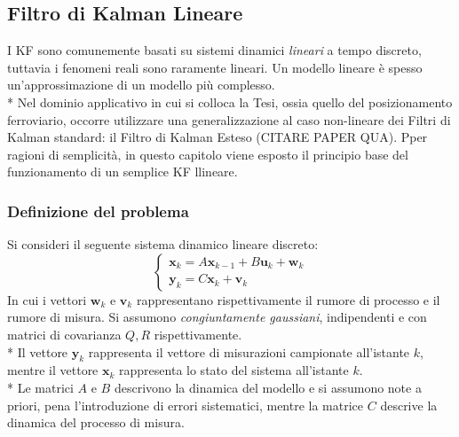 \subsection{Filtro di Kalman Lineare}
I KF sono comunemente basati su sistemi dinamici \emph{lineari} a tempo discreto, tuttavia i fenomeni reali sono raramente lineari. Un modello lineare \`e spesso un'approssimazione di un modello pi\`u complesso.\\*
Nel dominio applicativo in cui si colloca la Tesi, ossia quello del posizionamento ferroviario, occorre utilizzare una generalizzazione al caso non-lineare dei Filtri di Kalman standard: il Filtro di Kalman Esteso (CITARE PAPER QUA). Pper ragioni di semplicit\`a, in questo capitolo viene esposto il principio base del funzionamento di un semplice KF llineare.
\subsubsection{Definizione del problema}
Si consideri il seguente sistema dinamico lineare discreto:
$$
\begin{cases}
\mathbf x_k = A \mathbf x_{k-1} + B \mathbf u_k + \mathbf w_k \\
\mathbf y_k = C \mathbf x_k + \mathbf v_k
\end{cases}
$$
In cui i vettori $\mathbf w_k$ e $\mathbf v_k$ rappresentano rispettivamente il rumore di processo e il rumore di misura. Si assumono \emph{congiuntamente gaussiani}, indipendenti e con matrici di covarianza $Q,R$ rispettivamente.\\*
Il vettore $\mathbf y_k$ rappresenta il vettore di misurazioni campionate all'istante $k$, mentre il vettore $\mathbf x_k$ rappresenta lo stato del sistema all'istante $k$.\\*
Le matrici $A$ e $B$ descrivono la dinamica del modello e si assumono note a priori, pena l'introduzione di errori sistematici, mentre la matrice $C$ descrive la dinamica del processo di misura.
